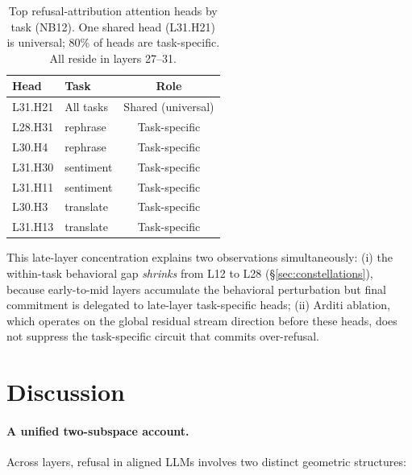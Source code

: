 \documentclass[11pt]{article}
\begin{document}
\begin{table}[h]
\centering
\small
\setlength{\tabcolsep}{5pt}
\begin{tabular}{llc}
\toprule
Head & Task & Role \\
\midrule
L31.H21 & All tasks    & Shared (universal) \\
L28.H31 & rephrase     & Task-specific \\
L30.H4  & rephrase     & Task-specific \\
L31.H30 & sentiment    & Task-specific \\
L31.H11 & sentiment    & Task-specific \\
L30.H3  & translate    & Task-specific \\
L31.H13 & translate    & Task-specific \\
\bottomrule
\end{tabular}
\caption{Top refusal-attribution attention heads by task (NB12). One shared head
(L31.H21) is universal; 80\% of heads are task-specific. All reside in layers 27--31.}
\label{tab:heads}
\end{table}

This late-layer concentration explains two observations simultaneously: (i) the
within-task behavioral gap \emph{shrinks} from L12 to L28 (\S\ref{sec:constellations}),
because early-to-mid layers accumulate the behavioral perturbation but final commitment
is delegated to late-layer task-specific heads; (ii) Arditi ablation, which operates on
the global residual stream direction before these heads, does not suppress the
task-specific circuit that commits over-refusal.

\section{Discussion}
\label{sec:discussion}

\paragraph{A unified two-subspace account.}
Across layers, refusal in aligned LLMs involves two distinct geometric structures:
\end{document}
